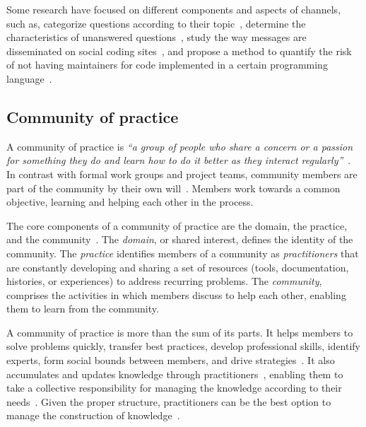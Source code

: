 \documentclass{sig-alternate-05-2015}
\begin{document}
	Some research have focused on different components and aspects of channels, such as,
categorize questions according to their topic~\cite{Treude2011}, determine the characteristics of unanswered questions~\cite{Asaduzzaman2013}, study the way messages are disseminated on social coding sites~\cite{Jiang2013}, and propose a method to quantify the risk of not having maintainers for code implemented in a certain programming language~\cite{Vasilescu2013b}.

\subsection{Community of practice}
	A community of practice is \textit{``a group of people who share a concern or a passion for something they do and learn how to do it better as they interact regularly''}~\cite{Wenger2000}.
	In contrast with formal work groups and project teams, community members are part of the community by their own will~\cite{Wenger2000}.
	Members work towards a common objective, learning and helping each other in the process.

	The core components of a community of practice are the domain, the practice, and the community~\cite{Wenger2011}.
	The \textit{domain}, or shared interest, defines the identity of the community.
	The \textit{practice} identifies members of a community as \textit{practitioners} that are constantly developing and sharing a set of resources (tools, documentation, histories, or experiences) to address recurring problems. 
	The \textit{community}, comprises the activities in which members discuss to help each other, enabling them to learn from the community.

	A community of practice is more than the sum of its parts.
	It helps members to solve problems quickly, transfer best practices, develop professional skills, identify experts, form social bounds between members, and drive strategies~\cite{Wenger2011, Storey2014}.
	It also accumulates and updates knowledge through practitioners~\cite{Wenger2010}, enabling them to take a collective responsibility for managing the knowledge according to their needs~\cite{Wenger2011}.
	Given the proper structure, practitioners can be the best option to manage the construction of knowledge~\cite{Wenger2011}.

\end{document}
